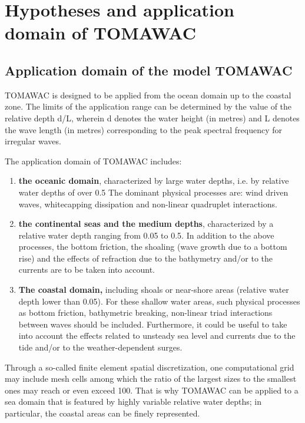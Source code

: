 

\chapter{  Hypotheses and application domain of TOMAWAC}


\section{ Application domain of the model TOMAWAC}

 TOMAWAC is designed to be applied from the ocean domain up to the coastal zone. The limits of the application range can be determined by the value of the relative depth d/L, wherein d denotes the water height (in metres) and L denotes the wave length (in metres) corresponding to the peak spectral frequency for irregular waves.

 The application domain of TOMAWAC includes:

 \begin{enumerate}
\item \textbf{the oceanic domain}, characterized by large water depths, i.e. by relative water depths of over 0.5 The dominant physical processes are: wind driven waves, whitecapping dissipation and non-linear quadruplet interactions.

 \item \textbf{the continental seas and the medium depths}, characterized by a relative water depth ranging from 0.05 to 0.5. In addition to the above processes, the bottom friction, the shoaling (wave growth due to a bottom rise) and the effects of refraction due to the bathymetry and/or to the currents are to be taken into account.

 \item \textbf{The coastal domain, }including shoals or near-shore areas (relative water depth lower than 0.05). For these shallow water areas, such physical processes as bottom friction, bathymetric breaking, non-linear triad interactions between waves should be included. Furthermore, it could be useful to take into account the effects related to unsteady sea level and currents due to the tide and/or to the weather-dependent surges.
\end{enumerate}

 Through a so-called finite element spatial discretization, one computational grid may include mesh cells among which the ratio of the largest sizes to the smallest ones may reach or even exceed 100. That is why TOMAWAC can be applied to a sea domain that is featured by highly variable relative water depths; in particular, the coastal areas can be finely represented.

